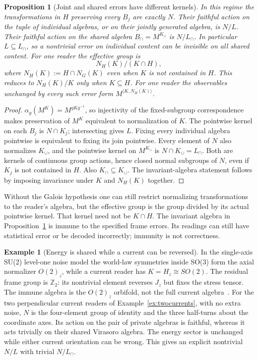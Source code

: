 \documentclass[12pt]{article}
\newtheorem{proposition}[theorem]{Proposition}
\theoremstyle{definition}
\newtheorem{example}[theorem]{Example}
\theoremstyle{remark}
\begin{document}
\begin{proposition}[Joint and shared errors have different kernels]
\label{prop:errorgroup}
In this regime the transformations in $H$ preserving every $B_j$ are exactly
$N$. Their faithful action on the tuple of individual algebras, or on their
jointly generated algebra, is $N/L$. Their faithful action on the shared algebra
$B_\cap=M^{K_\cup}$ is $N/L_\cap$. In particular $L\subseteq L_\cap$, so a
nontrivial error on individual content can be invisible on all shared content.
For one reader the effective group is
\[
 N_H(K)/(K\cap H),
\]
where $N_H(K):=H\cap N_G(K)$ even when $K$ is not contained in $H$.
This reduces to $N_H(K)/K$ only when $K\subseteq H$.
For one reader the observables unchanged by every such error form
$M^{\overline{\langle K,N_H(K)\rangle}}$.
\end{proposition}
\begin{proof}
$\alpha_g(M^K)=M^{gKg^{-1}}$, so injectivity of the fixed-subgroup correspondence
makes preservation of $M^K$ equivalent to normalization of $K$.
The pointwise kernel on each $B_j$ is $N\cap K_j$; intersecting gives $L$.
Fixing every individual algebra pointwise is equivalent to fixing its join
pointwise. Every element of $N$ also normalizes $K_\cup$, and the pointwise
kernel on $M^{K_\cup}$ is $N\cap K_\cup=L_\cap$.
Both are kernels of continuous group actions, hence closed normal subgroups
of $N$, even if $K_j$ is not contained in $H$. Also $K_\cap\subseteq K_\cup$.
The invariant-algebra statement follows by imposing invariance under $K$ and
$N_H(K)$ together.
\end{proof}

Without the Galois hypothesis one can still restrict normalizing transformations
to the reader's algebra, but the effective group is the group divided by its
actual pointwise kernel. That kernel need not be $K\cap H$.
The invariant algebra in Proposition~\ref{prop:errorgroup} is immune to the
specified frame errors. Its readings can still have statistical error or be
decoded incorrectly; immunity is not correctness.

\begin{example}[Energy is shared while a current can be reversed]
In the single-axis SU(2) level-one noise model the world-law symmetries inside
SO(3) form the axial normalizer $O(2)_z$, while a current reader has
$K=H_z\cong SO(2)$. The residual frame group is $\mathbb Z_2$: its nontrivial
element reverses $J_z$ but fixes the stress tensor. The immune algebra is the
$O(2)_z$ orbifold, not the full current algebra~\cite{FoundationI}.
For the two perpendicular current readers of Example~\ref{ex:twocurrents},
with no extra noise, $N$ is the four-element group of identity and the three
half-turns about the coordinate axes. Its action on the pair of private
algebras is faithful, whereas it acts trivially on their shared Virasoro
algebra. The energy sector is unchanged while either current orientation can
be wrong. This gives an explicit nontrivial $N/L$ with trivial $N/L_\cap$.
\end{example}
\end{document}
